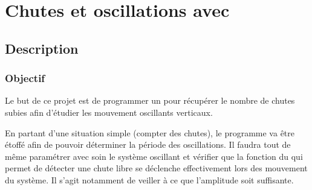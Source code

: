 \section{Chutes et oscillations avec \mb}


\pagestyle{mb}

\subsection{Description}

\subsubsection{Objectif}

\begin{formule}
Le but de ce projet est de programmer un \mb pour récupérer le nombre de chutes subies afin d'étudier les mouvement oscillants verticaux.

En partant d'une situation simple (compter des chutes), le programme va être étoffé afin de pouvoir déterminer la période des oscillations. Il faudra tout de même paramétrer avec soin le système oscillant et vérifier que la fonction du \mb qui permet de détecter une chute libre se déclenche effectivement lors des mouvement du système. Il s'agit notamment de veiller à ce que l'amplitude soit suffisante.
\end{formule}

